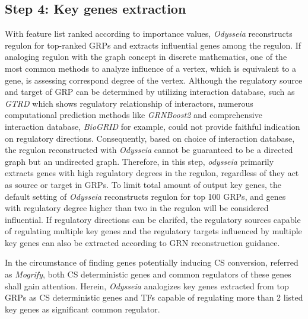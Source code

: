 \documentclass[fleqn,10pt]{wlscirep}
\begin{document}
\subsection*{Step 4: Key genes extraction}
\label{step4}
With feature list ranked according to importance values, \emph{Odysseia} reconstructs regulon for top-ranked GRPs and extracts influential genes among the regulon.
If analoging regulon with the graph concept in discrete mathematics, one of the most common methods to analyze influence of a vertex, which is equivalent to a gene, is assessing correspond degree of the vertex.
Although the regulatory source and target of GRP can be determined by utilizing interaction database, such as \emph{GTRD}\cite{gkaa1057} which shows regulatory relationship of interactors, numerous computational prediction methods like \emph{GRNBoost2}\cite{grnboost2} and comprehensive interaction database, \emph{BioGRID}\cite{biogrid} for example, could not provide faithful indication on regulatory directions.
Consequently, based on choice of interaction database, the regulon reconstructed with \emph{Odysseia} cannot be guaranteed to be a directed graph but an undirected graph.
Therefore, in this step, \emph{odysseia} primarily extracts genes with high regulatory degrees in the regulon, regardless of they act as source or target in GRPs.
To limit total amount of output key genes, the default setting of \emph{Odysseia} reconstructs regulon for top 100 GRPs, and genes with regulatory degree higher than two in the regulon will be considered influential.
If regulatory directions can be clarifed, the regulatory sources capable of regulating multiple key genes and the regulatory targets influenced by multiple key genes can also be extracted according to GRN reconstruction guidance.

In the circumstance of finding genes potentially inducing CS conversion, referred as \emph{Mogrify}\cite{mogrify_2016}, both CS deterministic genes and common regulators of these genes shall gain attention.
Herein, \emph{Odysseia} analogizes key genes extracted from top GRPs as CS deterministic genes and TFs capable of regulating more than 2 listed key genes as significant common regulator.
\end{document}
